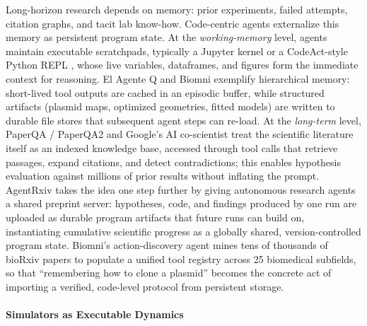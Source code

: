 \documentclass{llmxive}
\begin{document}
Long-horizon research depends on memory: prior experiments, failed attempts, citation graphs, and tacit lab know-how. Code-centric agents externalize this memory as persistent program state. At the \textit{working-memory} level, agents maintain executable scratchpads,  typically a Jupyter kernel or a CodeAct-style Python REPL \citep{jiang2025aideaidrivenexplorationspace},  whose live variables, dataframes, and figures form the immediate context for reasoning. El Agente Q \citep{Zou_2025} and Biomni \citep{huang2025biomni} exemplify hierarchical memory: short-lived tool outputs are cached in an episodic buffer, while structured artifacts (plasmid maps, optimized geometries, fitted models) are written to durable file stores that subsequent agent steps can re-load. At the \textit{long-term} level, PaperQA / PaperQA2 \citep{lala2023paperqaretrievalaugmentedgenerativeagent} and Google's AI co-scientist \citep{gottweis2025aicoscientist} treat the scientific literature itself as an indexed knowledge base, accessed through tool calls that retrieve passages, expand citations, and detect contradictions; this enables hypothesis evaluation against millions of prior results without inflating the prompt. AgentRxiv \citep{schmidgall2025agentrxivcollaborativeautonomousresearch} takes the idea one step further by giving autonomous research agents a shared preprint server: hypotheses, code, and findings produced by one run are uploaded as durable program artifacts that future runs can build on, instantiating cumulative scientific progress as a globally shared, version-controlled program state. Biomni's action-discovery agent \citep{huang2025biomni} mines tens of thousands of bioRxiv papers to populate a unified tool registry across 25 biomedical subfields, so that ``remembering how to clone a plasmid'' becomes the concrete act of importing a verified, code-level protocol from persistent storage.

\paragraph{Simulators as Executable Dynamics}
\end{document}
